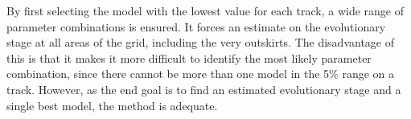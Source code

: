 
 By first selecting the model with the lowest \chis value for each track, a wide range of parameter combinations is ensured. It forces an estimate on the evolutionary stage at all areas of the grid, including the very outskirts. The disadvantage of this is that it makes it more difficult to identify the most likely parameter combination, since there cannot be more than one model in the 5\% range on a track. However, as the end goal is to find an estimated evolutionary stage and a single best model, the method is adequate.




